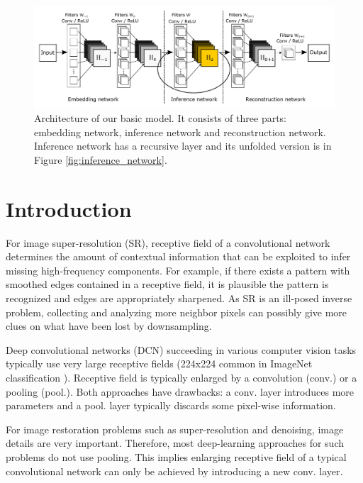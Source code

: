 \documentclass[10pt,twocolumn,letterpaper]{article}
\begin{document}
\begin{figure}[t]
	\includegraphics[width=\textwidth]{figs/f1}
	\caption {Architecture of our basic model. It consists of three parts: embedding network, inference network and reconstruction network. Inference network has a recursive layer and its unfolded version is in Figure \ref{fig:inference_network}.}
	\label{fig:overview}
\end{figure}


\section{Introduction}
For image super-resolution (SR), receptive field of a convolutional network determines the amount of contextual information that can be exploited to infer missing high-frequency components. For example, if there exists a pattern with smoothed edges contained in a receptive field, it is plausible the pattern is recognized and edges are appropriately sharpened. As SR is an ill-posed inverse problem, collecting and analyzing more neighbor pixels can possibly give more clues on what have been lost by downsampling. 

Deep convolutional networks (DCN) succeeding in various computer vision tasks typically use very large receptive fields  (224x224 common in ImageNet classification \cite{krizhevsky2012imagenet, simonyan2015very}). Receptive field is typically enlarged by a convolution (conv.) or a pooling (pool.).  Both approaches have drawbacks: a conv. layer introduces more parameters and a pool. layer typically discards some pixel-wise information. 


For image restoration problems such as super-resolution and denoising, image details are very important. Therefore, most deep-learning approaches for such problems do not use pooling. This implies enlarging receptive field of a typical convolutional network can only be achieved by introducing a new conv. layer.
\end{document}
